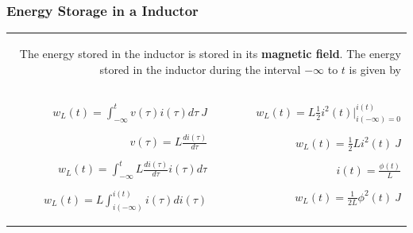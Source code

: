 \documentclass[aspectratio=169]{beamer}
\begin{document}
\begin{frame}[fragile]
\frametitle{Energy Storage in a Inductor}
	
	
	\begin{tabular}{r}

	\begin{columns}
		\begin{column}{1\textwidth}
		The energy stored in the inductor is stored in its \textbf{magnetic field}. The energy stored in the inductor during
the interval $-\infty$ to $t$ is given by 
		\end{column}
	  \end{columns}\\

	  \begin{columns}
		  \begin{column}{.5\textwidth}  %
\large 				\begin{flushleft} 
					$w_{L}(t)=\int_{-\infty}^{t} v(\tau)i(\tau) d\tau \ J$ 
					\end{flushleft}
\scriptsize				\begin{flushleft} 
					$v(\tau)=L \frac{di(\tau)}{d \tau}$
					\end{flushleft}			
					\begin{flushleft} 
					$w_{L}(t)=\int_{-\infty}^{t} L \frac{di(\tau)}{d \tau} i(\tau) d\tau$
					\end{flushleft}
					\begin{flushleft} 
					$w_{L}(t)=L\int_{i(-\infty)}^{i(t)} i(\tau) di(\tau) $
					\end{flushleft}

		\end{column}
		
		  \begin{column}{.4\textwidth}  %
\scriptsize		   		\begin{flushleft} 
					$w_{L}(t)=L\frac{1}{2}i^2(t) \Big|_{i(-\infty)=0}^{i(t)} $
					\end{flushleft}
					
\large 				\begin{flushleft} 			 
					$w_{L}(t)=\frac{1}{2}Li^2(t) \ J$
					\end{flushleft}
		   			
\scriptsize		   		\begin{flushleft} 
					$i(t)=\frac{\phi(t)}{L}$  
					\end{flushleft}
					
\large 				\begin{flushleft}
					 $w_{L}(t)=\frac{1}{2L}\phi^2(t) \ J$
					\end{flushleft}
 


\end{column}
\end{columns}
\end{tabular}
\end{frame}
\end{document}
